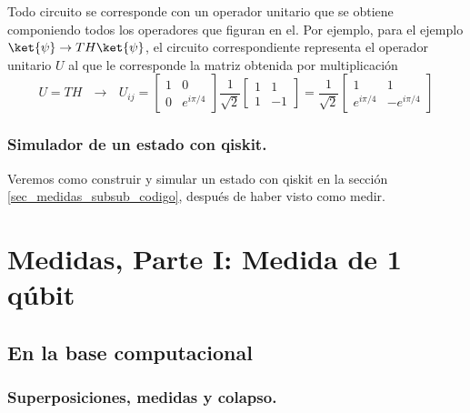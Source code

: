 \documentclass[a4paper,11pt]{book} %
\numberwithin{equation}{chapter}
\begin{document}
Todo circuito se corresponde con un operador unitario que se obtiene componiendo todos los operadores que figuran en el. Por ejemplo, para el ejemplo $	\ket{\psi} \to  TH \ket{\psi}$, el circuito correspondiente representa el operador unitario $U$ al que le corresponde la matriz obtenida por multiplicación
	\begin{equation}
	U = T H ~~~\to ~~~ U_{ij} = 
	\begin{bmatrix}1&0\\0&e^{i\pi/4}\end{bmatrix} \frac{1}{\sqrt{2}} 
	\begin{bmatrix} 1& 1 \\ 1 & -1 \end{bmatrix}  = 
	\frac{1}{\sqrt{2}} \begin{bmatrix} 1& 1 \\ e^{i\pi/4} & -e^{i\pi/4} \end{bmatrix} 
	\end{equation}

		\subsection{Simulador de un estado con qiskit.}
		
Veremos como construir y simular un estado con qiskit en la sección \ref{sec_medidas_subsub_codigo}, después de haber visto como medir.

















\chapter{Medidas, Parte I: Medida de 1 qúbit}

    \section{En la base computacional}
		\subsection{Superposiciones, medidas y colapso.}
	
\end{document}

